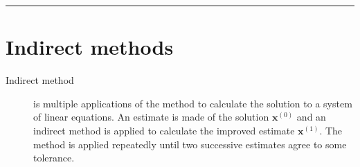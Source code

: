 \documentclass[letterpaper,10pt,english]{jupyterBook}
\begin{document}
\bigskip\hrule\bigskip



\section{Indirect methods}
\label{\detokenize{8_Appendices/8.0_Cheat_sheet:indirect-methods}}\begin{description}
\item[{Indirect method\label{\detokenize{8_Appendices/8.0_Cheat_sheet:term-Indirect-method}}}] \leavevmode
\sphinxAtStartPar
{\hyperref[\detokenize{7_Indirect_methods/7.0_Indirect_methods:indirect-methods-chapter}]{}} is multiple applications of the method to calculate the solution to a system of linear equations. An estimate is made of the solution \(\mathbf{x}^{(0)}\) and an indirect method is applied to calculate the improved estimate \(\mathbf{x}^{(1)}\). The method is applied repeatedly until two successive estimates agree to some tolerance.


\end{description}
\end{document}
